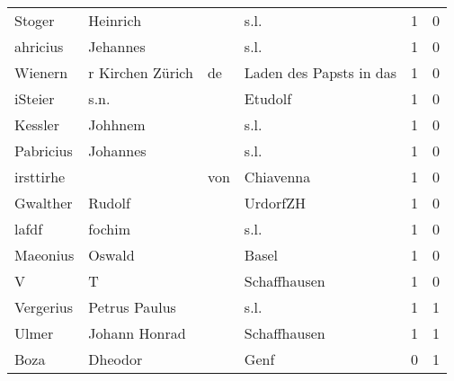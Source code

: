 \begin{tabular}{llllrr}
                   Stoger &                           Heinrich &             &                                        s.l. &          1 &         0 \\
                 ahricius &                           Jehannes &             &                                        s.l. &          1 &         0 \\
                  Wienern &                   r Kirchen Zürich &          de &                     Laden des Papsts in das &          1 &         0 \\
                  iSteier &                               s.n. &             &                                     Etudolf &          1 &         0 \\
                  Kessler &                            Johhnem &             &                                        s.l. &          1 &         0 \\
                Pabricius &                           Johannes &             &                                        s.l. &          1 &         0 \\
                irsttirhe &                                    &         von &                                   Chiavenna &          1 &         0 \\
                 Gwalther &                             Rudolf &             &                                    UrdorfZH &          1 &         0 \\
                    lafdf &                             fochim &             &                                        s.l. &          1 &         0 \\
                 Maeonius &                             Oswald &             &                                       Basel &          1 &         0 \\
                        V &                                  T &             &                                Schaffhausen &          1 &         0 \\
                Vergerius &                      Petrus Paulus &             &                                        s.l. &          1 &         1 \\
                    Ulmer &                      Johann Honrad &             &                                Schaffhausen &          1 &         1 \\
                     Boza &                            Dheodor &             &                                        Genf &          0 &         1 \\

\end{tabular}
